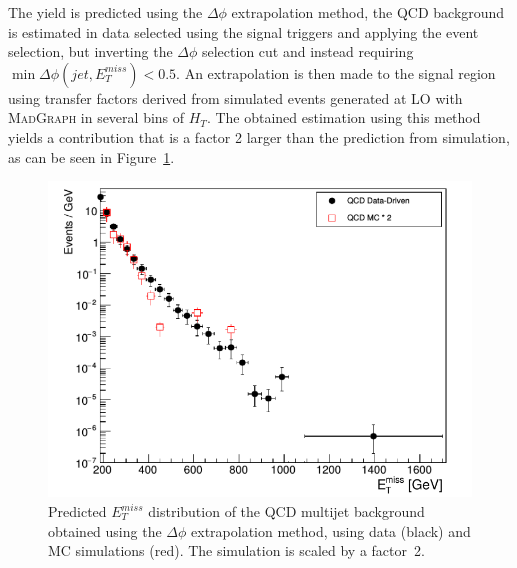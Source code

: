 The yield is predicted using 
the $\Delta\phi$ extrapolation method, the QCD background is estimated in data selected using the signal triggers and applying the event selection, but inverting the $\Delta\phi$ selection cut and instead requiring $\min\Delta\phi(jet, E_T^{miss}) < 0.5$. An extrapolation is then made to the signal region using transfer factors derived from simulated events generated at \ac{LO} with \textsc{MadGraph} in several bins of $H_T$. The obtained estimation using this method yields a contribution that is a factor 2 larger than the prediction from simulation, 
as can be seen in Figure~\ref{fig:QCD_prediction}.

\begin{figure}[ht]
  \centering
 \includegraphics[width=.7\textwidth]{QCD_prediction.png} 
 \caption{Predicted $E_T^{miss}$ distribution of the QCD multijet background obtained using the $\Delta\phi$ extrapolation method, using data (black) and MC simulations (red). The simulation is scaled by a factor~2.}
 \label{fig:QCD_prediction}
\end{figure}


